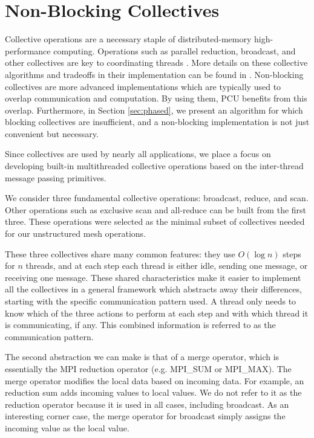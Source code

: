 \documentclass[final,1p,times]{elsarticle}
\begin{document}
\section{Non-Blocking Collectives}
\label{sec:coll}
Collective operations are a necessary staple of
distributed-memory high-performance computing.
Operations such as parallel reduction, broadcast, and other collectives
are key to coordinating threads \cite{pjevsivac2007performance}.
More details on these collective algorithms and tradeoffs in their
implementation can be found in \cite{thakur2003improving}.
Non-blocking collectives are more advanced implementations which
are typically used to overlap communication and computation.
By using them, PCU benefits from this overlap.
Furthermore, in Section \ref{sec:phased}, we present an algorithm
for which blocking collectives are insufficient, and a non-blocking
implementation is not just convenient but necessary.

Since collectives are used by nearly all applications,
we place a focus on developing built-in
multithreaded collective operations based on the
inter-thread message passing primitives.

We consider three fundamental collective operations:
broadcast, reduce, and scan.
Other operations such as exclusive scan and all-reduce
can be built from the first three.
These operations were selected as the minimal subset
of collectives needed for our unstructured mesh operations.

These three collectives share many common features:
they use $O(\log n)$ steps for $n$ threads,
and at each step each thread is either idle, sending one
message, or receiving one message.
These shared characteristics make it easier to implement
all the collectives in a general framework which abstracts
away their differences, starting with the specific communication
pattern used.
A thread only needs to know which of the three actions to perform at each
step and with which thread it is communicating, if any.
This combined information is referred to as the communication pattern.

The second abstraction we can make is that of a merge operator, which is
essentially the MPI reduction operator (e.g. MPI\_SUM or MPI\_MAX).
The merge operator modifies the local data based on incoming data.
For example, an reduction sum adds incoming values to local values.
We do not refer to it as the reduction operator because it is used
in all cases, including broadcast.
As an interesting corner case, the merge operator for broadcast simply
assigns the incoming value as the local value.
\end{document}
